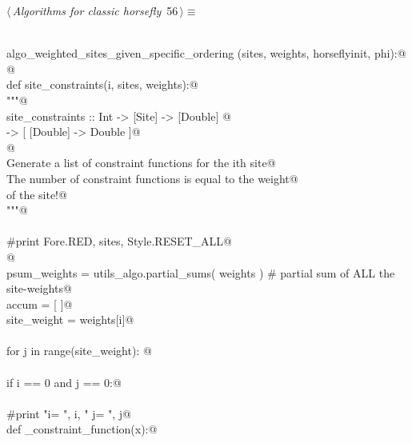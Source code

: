 \documentclass[11.5pt]{report}
\begin{document}
\vspace{-0.8cm} \newchunk
\begin{flushleft} \small\label{scrap79}\raggedright\small
{} $\langle\,${\itshape Algorithms for classic horsefly}\nobreak\ {\footnotesize {56}}$\,\rangle\equiv$
\vspace{-1ex}
\begin{list}{}{} \item
\mbox{}\verb@@\\
\mbox{}\verb@def algo_weighted_sites_given_specific_ordering (sites, weights, horseflyinit, phi):@\\
\mbox{}\verb@      @\\
\mbox{}\verb@     def site_constraints(i, sites, weights):@\\
\mbox{}\verb@          """@\\
\mbox{}\verb@          site_constraints :: Int -> [Site] -> [Double] @\\
\mbox{}\verb@                          -> [ [Double] -> Double  ]@\\
\mbox{}\verb@          @\\
\mbox{}\verb@          Generate a list of constraint functions for the ith site@\\
\mbox{}\verb@          The number of constraint functions is equal to the weight@\\
\mbox{}\verb@          of the site!@\\
\mbox{}\verb@          """@\\
\mbox{}\verb@@\\
\mbox{}\verb@          #print Fore.RED, sites, Style.RESET_ALL@\\
\mbox{}\verb@         @\\
\mbox{}\verb@          psum_weights = utils_algo.partial_sums( weights ) # partial sum of ALL the site-weights@\\
\mbox{}\verb@          accum        = [ ]@\\
\mbox{}\verb@          site_weight  = weights[i]@\\
\mbox{}\verb@@\\
\mbox{}\verb@          for j in range(site_weight): @\\
\mbox{}\verb@@\\
\mbox{}\verb@              if i == 0 and j == 0:@\\
\mbox{}\verb@@\\
\mbox{}\verb@                    #print "i= ", i, " j= ", j@\\
\mbox{}\verb@                    def _constraint_function(x):@\\

\end{list}
\end{flushleft}
\end{document}
